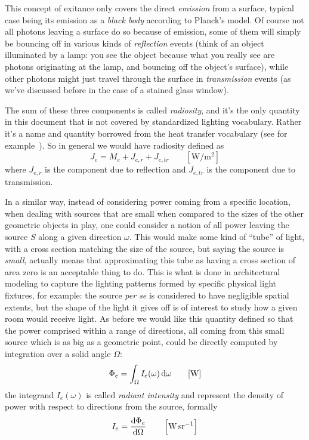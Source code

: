 This concept of exitance only covers the direct \textsl{\gls{emission}} from a surface,
typical case being its emission as a \textsl{\gls{black body}} according to Planck's model.
Of course not all photons leaving a surface do so because of emission, some of them
will simply be bouncing off in various kinds of \textsl{\gls{reflection}} events (think
of an object illuminated by a lamp: you see the object because what you really see are
photons originating at the lamp, and bouncing off the object's surface), 
while other photons might just travel through the surface in \textsl{\gls{transmission}} events
(as we've discussed before in the case of a stained glass window).

The sum of these three components is called \textsl{\gls{radiosity}}, and it's the only quantity
in this document that is not covered by standardized lighting vocabulary. 
Rather it's a name and quantity borrowed from the heat transfer vocabulary 
(see for example~\cite{iso:9288:2022}).
So in general we would have radiosity defined as
\begin{equation}
	J_e = M_e + J_{e,r} + J_{e,tr} \qquad \left[\unit{\watt\per\square\meter}\right]
\end{equation}
where $J_{e,r}$ is the component due to reflection and $J_{e,tr}$ is the component due to transmission.

In a similar way, instead of considering power coming from a specific location,
when dealing with sources that are small when compared to the sizes of the other 
geometric objects in play, one could consider a notion of all power leaving the 
source $S$ along a given direction $\omega$. This would make some kind of ``tube'' of light,
with a cross section matching the size of the source, but saying the source is \emph{small},
actually means that approximating this tube as having a cross section of area zero is an acceptable
thing to do.
This is what is done in architectural modeling to capture the lighting patterns formed by
specific physical light fixtures, for example: the source \emph{per se} is considered to have
negligible spatial extents, but the shape of the light it gives off is of interest to 
study how a given room would receive light.
As before we would like this quantity defined so that the power comprised within a range of
directions, all coming from this small source which is as big as a geometric point,
could be directly computed by integration over a solid angle $\Omega$:
\begin{equation}
	\Phi_e = \int_\Omega I_e(\omega) \d\omega \qquad [\unit{\watt}]
\end{equation}
the integrand $I_e(\omega)$ is called \textsl{\gls{radiant intensity}} and represent
the density of power with respect to directions from the source, formally
\begin{equation}
	I_e = \frac{\d\Phi_e}{\d\Omega} \qquad \left[\unit{\watt\per\steradian}\right]
\end{equation}

